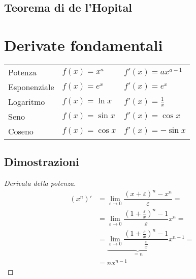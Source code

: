 \subsection{Teorema di de l'Hopital}
\begin{theorem}
\end{theorem}

\section{Derivate fondamentali}
\begin{center}
    \begin{tabular}{lll}
        Potenza      & $f(x) = x^a$       & $f'(x) = a x^{a-1}$    \\
        Esponenziale & $f(x) = e^x$       & $f'(x) = e^x$          \\
        Logaritmo    & $f(x) = \ln x$     & $f'(x) = \frac{1}{x}$  \\
        Seno         & $f(x) = \sin x$    & $f'(x) = \cos x$       \\
        Coseno       & $f(x) = \cos x$    & $f'(x) =-\sin x$       \\
    \end{tabular}
\end{center}
\subsection{Dimostrazioni}
\begin{proof}[Derivata della potenza]
\begin{equation}
    \begin{aligned}
    (x^n)'
        & = \lim_{\varepsilon \rightarrow 0 } \dfrac{(x+\varepsilon)^n - x^n}{\varepsilon} = \\
        & = \lim_{\varepsilon \rightarrow 0 } \dfrac{ \left( 1 + \frac{\varepsilon}{x} \right)^n - 1 }{\varepsilon} x^n = \\
        & = \underbrace{\lim_{\varepsilon \rightarrow 0 } \dfrac{ \left( 1 + \frac{\varepsilon}{x} \right)^n - 1 }{\frac{\varepsilon}{x}}}_{=n} x^{n-1} = \\
        & = n x^{n-1}
    \end{aligned}
\end{equation}
\end{proof}

